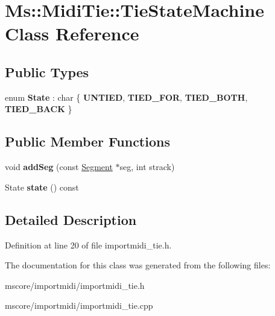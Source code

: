 \hypertarget{class_ms_1_1_midi_tie_1_1_tie_state_machine}{}\section{Ms\+:\+:Midi\+Tie\+:\+:Tie\+State\+Machine Class Reference}
\label{class_ms_1_1_midi_tie_1_1_tie_state_machine}
\subsection*{Public Types}
\begin{DoxyCompactItemize}
\item 
\mbox{\label{class_ms_1_1_midi_tie_1_1_tie_state_machine_aad44e1c6121044a62933693a0792bfd4}} 
enum {\bfseries State} \+: char \{ {\bfseries U\+N\+T\+I\+ED}, 
{\bfseries T\+I\+E\+D\+\_\+\+F\+OR}, 
{\bfseries T\+I\+E\+D\+\_\+\+B\+O\+TH}, 
{\bfseries T\+I\+E\+D\+\_\+\+B\+A\+CK}
 \}
\end{DoxyCompactItemize}
\subsection*{Public Member Functions}
\begin{DoxyCompactItemize}
\item 
\mbox{\label{class_ms_1_1_midi_tie_1_1_tie_state_machine_afeec7ef49d3847d0a4c532a65ee2393a}} 
void {\bfseries add\+Seg} (const \hyperlink{class_ms_1_1_segment}{Segment} $\ast$seg, int strack)
\item 
\mbox{\label{class_ms_1_1_midi_tie_1_1_tie_state_machine_a1db5190d9a960042fa0605f7305e91cb}} 
State {\bfseries state} () const
\end{DoxyCompactItemize}


\subsection{Detailed Description}


Definition at line 20 of file importmidi\+\_\+tie.\+h.



The documentation for this class was generated from the following files\+:\begin{DoxyCompactItemize}
\item 
mscore/importmidi/importmidi\+\_\+tie.\+h\item 
mscore/importmidi/importmidi\+\_\+tie.\+cpp\end{DoxyCompactItemize}
